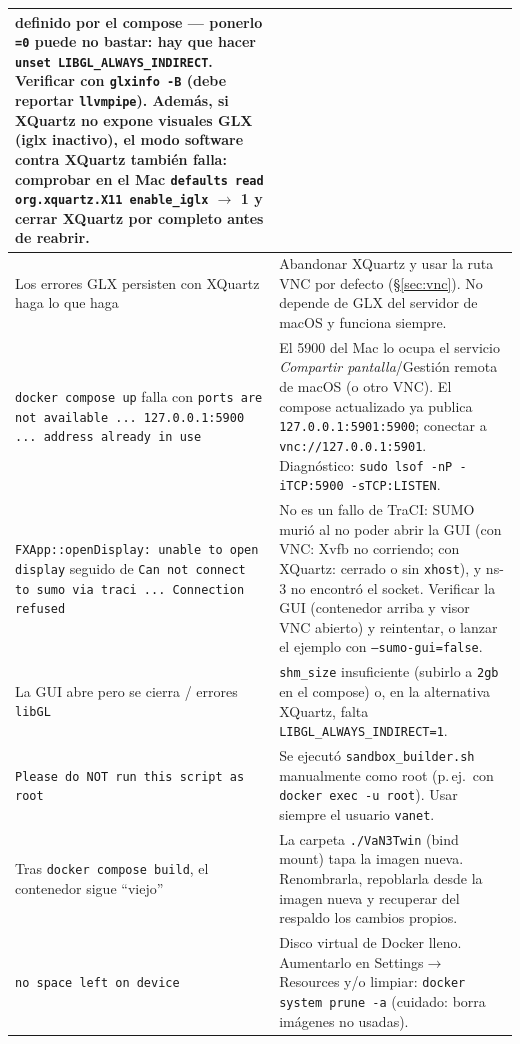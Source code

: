 \documentclass[11pt,a4paper]{article}
\begin{document}
\begin{center}
\begin{tabular}{@{}p{}p{}@{}}
definido por el compose --- ponerlo \texttt{=0} puede no bastar: hay que
hacer \texttt{unset LIBGL\_ALWAYS\_INDIRECT}. Verificar con
\texttt{glxinfo -B} (debe reportar \texttt{llvmpipe}). Adem\'as, si XQuartz
no expone visuales GLX (iglx inactivo), el modo software contra XQuartz
tambi\'en falla: comprobar en el Mac \texttt{defaults read org.xquartz.X11
enable\_iglx} $\to$ 1 y cerrar XQuartz por completo antes de reabrir. \\
\midrule
Los errores GLX persisten con XQuartz haga lo que haga & Abandonar XQuartz y
usar la ruta VNC por defecto (\S\ref{sec:vnc}). No depende de GLX
del servidor de macOS y funciona siempre. \\
\midrule
\texttt{docker compose up} falla con \texttt{ports are not available ...
127.0.0.1:5900 ... address already in use} & El 5900 del Mac lo ocupa el
servicio \emph{Compartir pantalla}/Gesti\'on remota de macOS (o otro VNC).
El compose actualizado ya publica \texttt{127.0.0.1:5901:5900}; conectar a
\texttt{vnc://127.0.0.1:5901}. Diagn\'ostico: \texttt{sudo lsof -nP
-iTCP:5900 -sTCP:LISTEN}. \\
\midrule
\texttt{FXApp::openDisplay: unable to open display} seguido de
\texttt{Can not connect to sumo via traci ... Connection refused} & No es un
fallo de TraCI: SUMO muri\'o al no poder abrir la GUI (con VNC: Xvfb no
corriendo; con XQuartz: cerrado o sin \texttt{xhost}), y ns-3 no encontr\'o
el socket. Verificar la GUI (contenedor arriba y visor VNC abierto) y reintentar, o lanzar el ejemplo con
\texttt{--sumo-gui=false}. \\
\midrule
La GUI abre pero se cierra / errores \texttt{libGL} & \texttt{shm\_size}
insuficiente (subirlo a \texttt{2gb} en el compose) o, en la alternativa
XQuartz, falta \texttt{LIBGL\_ALWAYS\_INDIRECT=1}. \\
\midrule
\texttt{Please do NOT run this script as root} & Se ejecut\'o
\texttt{sandbox\_builder.sh} manualmente como root (p.\,ej.\ con
\texttt{docker exec -u root}). Usar siempre el usuario \texttt{vanet}. \\
\midrule
Tras \texttt{docker compose build}, el contenedor sigue ``viejo'' & La
carpeta \texttt{./VaN3Twin} (bind mount) tapa la imagen nueva. Renombrarla,
repoblarla desde la imagen nueva y recuperar del respaldo los cambios
propios. \\
\midrule
\texttt{no space left on device} & Disco virtual de Docker lleno. Aumentarlo
en Settings$\to$Resources y/o limpiar: \texttt{docker system prune -a}
(cuidado: borra im\'agenes no usadas). \\

\end{tabular}
\end{center}
\end{document}
